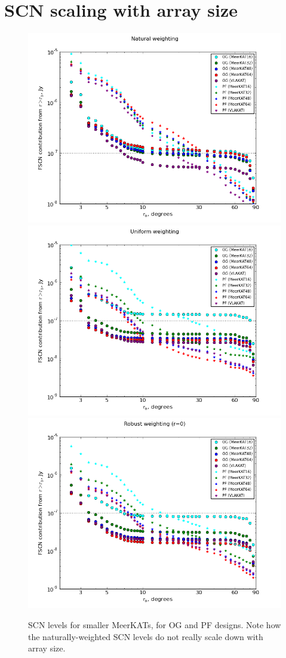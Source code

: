 \documentclass{aa}
\begin{document}
\section{SCN scaling with array size}
\label{sec:meerkatjes}

\begin{figure}
  \includegraphics[width=.33\textwidth]{cc-meerkatjes-natural}\hfill%
  \includegraphics[width=.33\textwidth]{cc-meerkatjes-uniform}\hfill%
  \includegraphics[width=.33\textwidth]{cc-meerkatjes-robust}
\caption{\label{fig:fscn-meerkatjes}SCN levels for smaller MeerKATs, for OG and PF designs. Note how the naturally-weighted SCN levels do not really scale down with array size.}

\end{figure}
\end{document}
